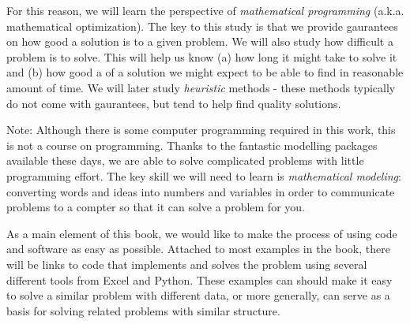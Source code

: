 For this reason, we will learn the perspective of \emph{mathematical programming} (a.k.a. mathematical optimization).  The key to this study is that we provide gaurantees on how good a solution is to a given problem.  We will also study how difficult a problem is to solve.  This will help us know (a) how long it might take to solve it and (b) how good a of a solution we might expect to be able to find in reasonable amount of time. We will later study \emph{heuristic} methods - these methods typically do not come with gaurantees, but tend to help find quality solutions.

Note: Although there is some computer programming required in this work, this is not a course on programming.   Thanks to the fantastic modelling packages available these days, we are able to solve complicated problems with little programming effort.   The key skill we will need to learn is \emph{mathematical modeling}: converting words and ideas into numbers and variables in order to communicate problems to a compter so that it can solve a problem for you.  

As a main element of this book, we would like to make the process of using code and software as easy as possible.  Attached to most examples in the book, there will be links to code that implements and solves the problem using several different tools from Excel and Python.  These examples can should make it easy to solve a similar problem with different data, or more generally, can serve as a basis for solving related problems with similar structure.
